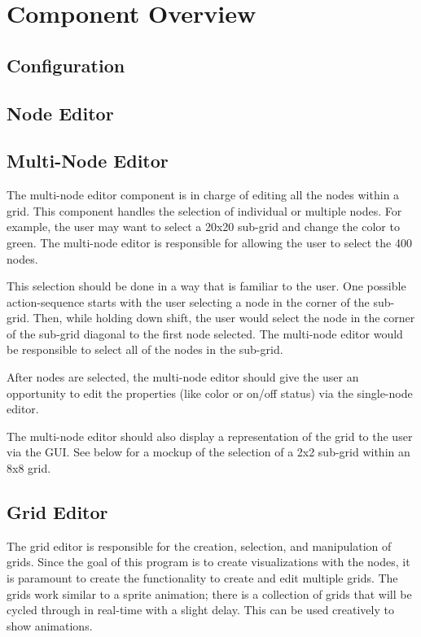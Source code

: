 \documentclass[12pt]{article}
\title{}
\begin{document}
\section{Component Overview}

\subsection{Configuration}
\subsection{Node Editor}

\subsection{Multi-Node Editor}
The multi-node editor component is in charge of editing all the nodes within a grid. This component handles the selection of individual or multiple nodes. For example, the user may want to select a 20x20 sub-grid and change the color to green. The multi-node editor is responsible for allowing the user to select the 400 nodes. 

This selection should be done in a way that is familiar to the user. One possible action-sequence starts with the user selecting a node in the corner of the sub-grid. Then, while holding down shift, the user would select the node in the corner of the sub-grid diagonal to the first node selected. The multi-node editor would be responsible to select all of the nodes in the sub-grid.

After nodes are selected, the multi-node editor should give the user an opportunity to edit the properties (like color or on/off status) via the single-node editor. 

The multi-node editor should also display a representation of the grid to the user via the GUI. See below for a mockup of the selection of a 2x2 sub-grid within an 8x8 grid.

\subsection{Grid Editor}
The grid editor is responsible for the creation, selection, and manipulation of grids. Since the goal of this program is to create visualizations with the nodes, it is paramount to create the functionality to create and edit multiple grids. The grids work similar to a sprite animation; there is a collection of grids that will be cycled through in real-time with a slight delay. This can be used creatively to show animations.
\end{document}
